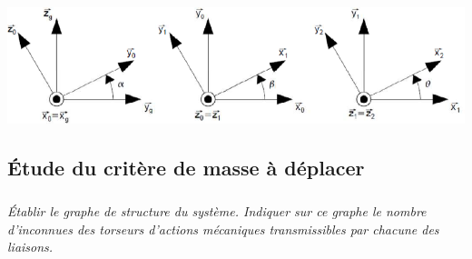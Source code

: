 \documentclass[10pt]{article}
\begin{document}
{\begin{center}
\includegraphics[width=.9\textwidth]{images/img3}
\end{center}
}

\subsection*{Étude du critère de masse à déplacer}

\subparagraph{}
\textit{Établir le graphe de structure du système. Indiquer sur ce graphe le nombre d'inconnues des torseurs d'actions mécaniques transmissibles par chacune des liaisons.}
\end{document}
